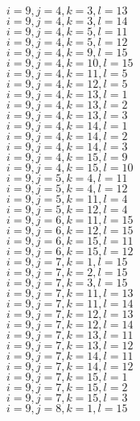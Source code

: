 \documentclass[14pt]{article}
\begin{document}
    $i=9,j=4,k=3,l=13 $ \\ 
    $i=9,j=4,k=3,l=14 $ \\ 
    $i=9,j=4,k=5,l=11 $ \\ 
    $i=9,j=4,k=5,l=12 $ \\ 
    $i=9,j=4,k=9,l=15 $ \\ 
    $i=9,j=4,k=10,l=15 $ \\ 
    $i=9,j=4,k=11,l=5 $ \\ 
    $i=9,j=4,k=12,l=5 $ \\ 
    $i=9,j=4,k=13,l=1 $ \\ 
    $i=9,j=4,k=13,l=2 $ \\ 
    $i=9,j=4,k=13,l=3 $ \\ 
    $i=9,j=4,k=14,l=1 $ \\ 
    $i=9,j=4,k=14,l=2 $ \\ 
    $i=9,j=4,k=14,l=3 $ \\ 
    $i=9,j=4,k=15,l=9 $ \\ 
    $i=9,j=4,k=15,l=10 $ \\ 
    $i=9,j=5,k=4,l=11 $ \\ 
    $i=9,j=5,k=4,l=12 $ \\ 
    $i=9,j=5,k=11,l=4 $ \\ 
    $i=9,j=5,k=12,l=4 $ \\ 
    $i=9,j=6,k=11,l=15 $ \\ 
    $i=9,j=6,k=12,l=15 $ \\ 
    $i=9,j=6,k=15,l=11 $ \\ 
    $i=9,j=6,k=15,l=12 $ \\ 
    $i=9,j=7,k=1,l=15 $ \\ 
    $i=9,j=7,k=2,l=15 $ \\ 
    $i=9,j=7,k=3,l=15 $ \\ 
    $i=9,j=7,k=11,l=13 $ \\ 
    $i=9,j=7,k=11,l=14 $ \\ 
    $i=9,j=7,k=12,l=13 $ \\ 
    $i=9,j=7,k=12,l=14 $ \\ 
    $i=9,j=7,k=13,l=11 $ \\ 
    $i=9,j=7,k=13,l=12 $ \\ 
    $i=9,j=7,k=14,l=11 $ \\ 
    $i=9,j=7,k=14,l=12 $ \\ 
    $i=9,j=7,k=15,l=1 $ \\ 
    $i=9,j=7,k=15,l=2 $ \\ 
    $i=9,j=7,k=15,l=3 $ \\ 
    $i=9,j=8,k=1,l=15 $ \\ 
\end{document}
